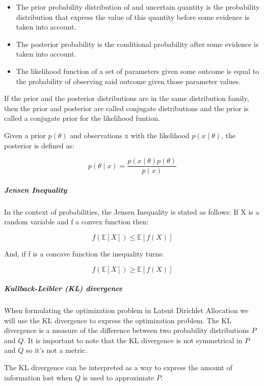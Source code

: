 \documentclass[12pt]{report}
\begin{document}
\begin{itemize}
\item The prior probability distribution of and uncertain quantity is the 
probability distribution that express the value of this quantity before 
some evidence is taken into account.
\item The posterior probability is the conditional probability after some 
evidence is taken into account.
\item The likelihood function of a set of parameters given some outcome 
is equal to the probability of observing said outcome given those 
parameter values.
\end{itemize}

If the prior and the posterior distributions are in the same distribution
family, then the prior and posterior are called conjugate distributions and the
prior is called a conjugate prior for the likelihood funtion.

Given a prior $p(\theta)$ and observations x with the likelihood 
$p(x \mid \theta)$, the posterior is defined as:

\begin{equation}
p(\theta \mid x) = \frac{p(x \mid \theta) p(\theta)}{p(x)}
\end{equation}


\subparagraph{Jensen Inequality}

In the context of probabilities, the Jensen Inequality is stated as follows: 
If X is a random variable and f a convex function then:

\begin{equation}
f(\mathbb{E}[X]) \leq \mathbb{E}[f(X)]
\end{equation}

And, if f is a concave function the inequality turns:

\begin{equation}
f(\mathbb{E}[X]) \geq \mathbb{E}[f(X)]
\end{equation}


\subparagraph{Kullback-Leibler (KL) divergence}

When formulating the optimization problem in Latent Dirichlet Allocation we 
will use the KL divergence to express the optimization problem. The KL divergence 
is a measure of the difference between two probability distributions $P$ and $Q$. 
It is important to note
that the KL divergence is not symmetrical in $P$ and $Q$ so it’s not a metric.

The KL divergence can be interpreted as a way to express the amount of 
information lost when $Q$ is used to approximate $P$.
\end{document}
